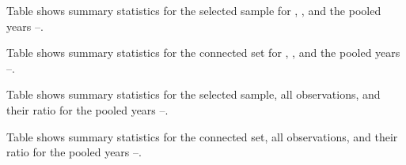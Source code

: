 \clearpage

%
\begin{table}
    \caption{Summary statistics for selected sample\label{tab:appendix_a2}}
    \resizebox{\textheight}{!}{%
    
    }
    \begin{tablenotes}
        \footnotesize
        Table shows summary statistics for the selected sample for \yearmin{}, \yearmax{}, and the pooled years \yearmin{}--\yearmax{}. %
    \end{tablenotes}
    \begin{tablenotes}[Source]
        \sourcedata%
    \end{tablenotes}
\end{table}
%

\clearpage

%
\begin{table}
    \caption{Summary statistics for the connected set\label{tab:appendix_a3}}
    \resizebox{\textheight}{!}{%
    
    }
    \begin{tablenotes}
        \footnotesize
        Table shows summary statistics for the connected set for \yearmin{}, \yearmax{}, and the pooled years \yearmin{}--\yearmax{}. %
    \end{tablenotes}
    \begin{tablenotes}[Source]
        \sourcedata%
    \end{tablenotes}
\end{table}
%

\clearpage

% 
\begin{table}
    \caption{Comparison of summary statistics (selection vs.\ all) \label{tab:appendix_a4}}
    \resizebox{\textheight}{!}{%
    
    }
    \begin{tablenotes}
        \footnotesize
        Table shows summary statistics for the selected sample, all observations, and their ratio for the pooled years \yearmin{}--\yearmax{}. %
    \end{tablenotes}
    \begin{tablenotes}[Source]
        \sourcedata%
    \end{tablenotes}
\end{table}
%

%
\begin{table}
    \caption{Comparison of summary statistics (connected vs.\ selection) \label{tab:appendix_a5}}
    \resizebox{\textheight}{!}{%
    
    }
    \begin{tablenotes}
        \footnotesize
        Table shows summary statistics for the connected set, all observations, and their ratio for the pooled years \yearmin{}--\yearmax{}. %
    \end{tablenotes}
    \begin{tablenotes}[Source]
        \sourcedata%
    \end{tablenotes}
\end{table}
%